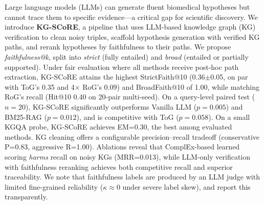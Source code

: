 Large language models (LLMs) can generate fluent biomedical hypotheses but cannot trace them to specific evidence---a critical gap for scientific discovery. We introduce \textbf{KG-SCoRE}, a pipeline that uses LLM-based knowledge graph (KG) verification to clean noisy triples, scaffold hypothesis generation with verified KG paths, and rerank hypotheses by faithfulness to their paths. We propose \emph{faithfulness@\textit{k}}, split into \emph{strict} (fully entailed) and \emph{broad} (entailed or partially supported). Under fair evaluation where all methods receive post-hoc path extraction, KG-SCoRE attains the highest StrictFaith@10 (0.36$\pm$0.05, on par with ToG's 0.35 and 4$\times$ RoG's 0.09) and BroadFaith@10 of 1.00, while matching RoG's recall (Hit@10 0.40 on 20-pair multi-seed). On a query-level paired test ($n{=}20$), KG-SCoRE significantly outperforms Vanilla LLM ($p{=}0.005$) and BM25-RAG ($p{=}0.012$), and is competitive with ToG ($p{=}0.058$). On a small KGQA probe, KG-SCoRE achieves EM=0.30, the best among evaluated methods. KG cleaning offers a configurable precision--recall tradeoff (conservative P=0.83, aggressive R=1.00). Ablations reveal that ComplEx-based learned scoring \emph{harms} recall on noisy KGs (MRR=0.013), while LLM-only verification with faithfulness reranking achieves both competitive recall and superior traceability. We note that faithfulness labels are produced by an LLM judge with limited fine-grained reliability ($\kappa{\approx}0$ under severe label skew), and report this transparently.
